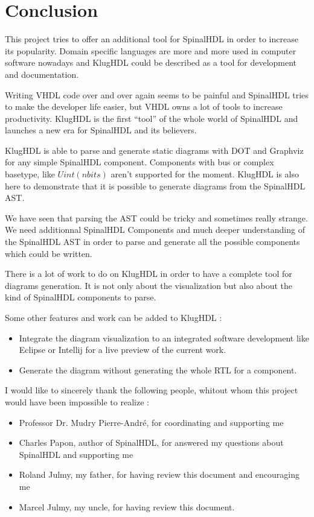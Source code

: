 \chapter{Conclusion}
\label{cha:Conclusion}

This project tries to offer an additional tool for SpinalHDL in order to
increase its popularity. Domain specific languages are more and more used in
computer software nowadays and KlugHDL could be described as a tool for
development and documentation.

Writing VHDL code over and over again seems to be painful and SpinalHDL tries to
make the developer life easier, but VHDL owns a lot of tools to increase
productivity. KlugHDL is the first ``tool'' of the whole world of SpinalHDL and
launches a new era for SpinalHDL and its believers.

KlugHDL is able to parse and generate static diagrams with DOT and Graphviz for
any simple SpinalHDL component. Components with bus or complex basetype, like
$Uint(n bits)$ aren't supported for the moment. KlugHDL is also here to
demonstrate that it is possible to generate diagrams from the SpinalHDL AST.

We have seen that parsing the AST could be tricky and sometimes really strange.
We need additionnal SpinalHDL Components and much deeper understanding of the
SpinalHDL AST in order to parse and generate all the possible components which
could be written.

There is a lot of work to do on KlugHDL in order to have a complete tool for
diagrams generation. It is not only about the visualization but also about the
kind of SpinalHDL components to parse.

Some other features and work can be added to KlugHDL :
\begin{itemize}
\item Integrate the diagram visualization to an integrated software development
  like Eclipse or Intellij for a live preview of the current work.
\item Generate the diagram without generating the whole RTL for a component.
\end{itemize}

I would like to sincerely thank the following people, whitout whom this project
would have been impossible to realize :

\begin{itemize}
\item Professor Dr. Mudry Pierre-André, for coordinating and supporting me
\item Charles Papon, author of SpinalHDL, for answered my questions about
  SpinalHDL and supporting me
\item Roland Julmy, my father, for having review this document and encouraging
  me
  \item Marcel Julmy, my uncle, for having review this document.
\end{itemize}

